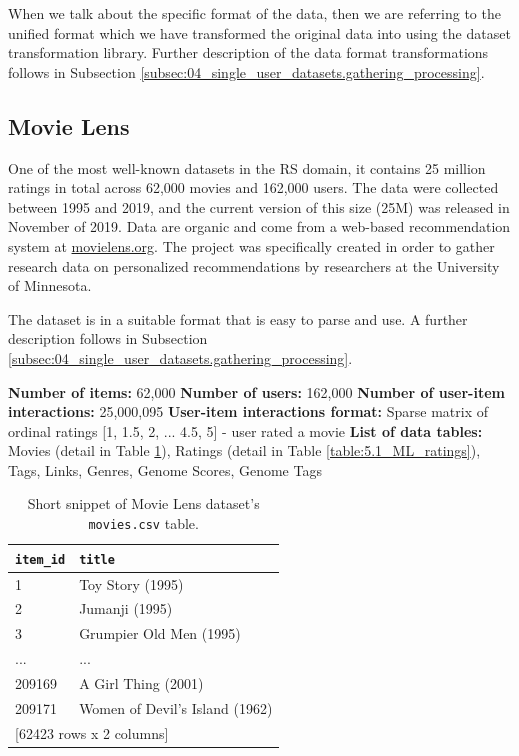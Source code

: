 When we talk about the specific format of the data, then we are referring to the unified format which we have transformed the original data into using the dataset transformation library. Further description of the data format transformations follows in Subsection \ref{subsec:04_single_user_datasets.gathering_processing}.



\subsection{Movie Lens}
One of the most well-known datasets in the RS domain, it contains 25 million ratings in total across 62,000 movies and 162,000 users. The data were collected between 1995 and 2019, and the current version of this size (25M) was released in November of 2019. Data are organic and come from a web-based recommendation system at \href{https://movielens.org/}{movielens.org}. The project was specifically created in order to gather research data on personalized recommendations by researchers at the University of Minnesota.

The dataset is in a suitable format that is easy to parse and use. A further description follows in Subsection \ref{subsec:04_single_user_datasets.gathering_processing}.

\hfill \break
\noindent
\textbf{Number of items:} 62,000 \newline
\textbf{Number of users:} 162,000 \newline
\textbf{Number of user-item interactions:} 25,000,095 \newline
\textbf{User-item interactions format:} Sparse matrix of ordinal ratings [1, 1.5, 2, ... 4.5, 5] - user rated a movie \newline
\textbf{List of data tables:} Movies (detail in Table \ref{table:5.1_ML_movies}), Ratings (detail in Table \ref{table:5.1_ML_ratings}), Tags, Links, Genres, Genome Scores, Genome Tags

\begin{table}[ht!]
\centering
\begin{tabular}{ l l }
\verb|item_id| & \verb|title| \\
    \hline
     1  &                   Toy Story (1995) \\
     2  &                     Jumanji (1995) \\
     3  &            Grumpier Old Men (1995) \\
   ...  &                                ... \\
209169  &                A Girl Thing (2001) \\
209171  &     Women of Devil's Island (1962) \\ [1mm]
\multicolumn{2}{l}{{[62423 rows x 2 columns]}}
\end{tabular}
\caption{Short snippet of Movie Lens dataset's \texttt{movies.csv} table.}
\label{table:5.1_ML_movies}
\end{table}


